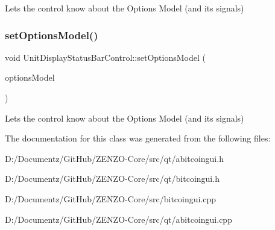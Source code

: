 Lets the control know about the Options Model (and its signals) \mbox{\label{class_unit_display_status_bar_control_ac8d2a43f66f3f71c7d6926dbd5927066}} 
\subsubsection{\texorpdfstring{setOptionsModel()}{setOptionsModel()}\hspace{0.1cm}{\footnotesize\ttfamily [2/2]}}
{\footnotesize\ttfamily void Unit\+Display\+Status\+Bar\+Control\+::set\+Options\+Model (\begin{DoxyParamCaption}\item[{\mbox{\hyperlink{class_options_model}{Options\+Model}} $\ast$}]{options\+Model }\end{DoxyParamCaption})}

Lets the control know about the Options Model (and its signals) 

The documentation for this class was generated from the following files\+:\begin{DoxyCompactItemize}
\item 
D\+:/\+Documentz/\+Git\+Hub/\+Z\+E\+N\+Z\+O-\/\+Core/src/qt/abitcoingui.\+h\item 
D\+:/\+Documentz/\+Git\+Hub/\+Z\+E\+N\+Z\+O-\/\+Core/src/qt/bitcoingui.\+h\item 
D\+:/\+Documentz/\+Git\+Hub/\+Z\+E\+N\+Z\+O-\/\+Core/src/bitcoingui.\+cpp\item 
D\+:/\+Documentz/\+Git\+Hub/\+Z\+E\+N\+Z\+O-\/\+Core/src/qt/abitcoingui.\+cpp\end{DoxyCompactItemize}
